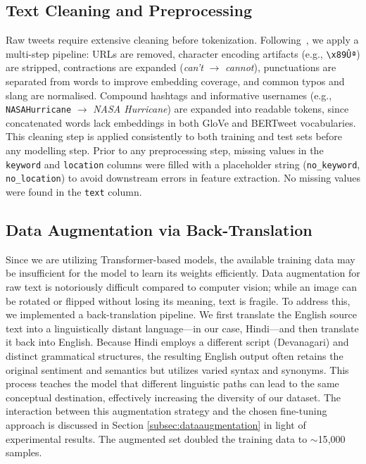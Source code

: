 \documentclass[conference]{IEEEtran}
\begin{document}
\subsection{Text Cleaning and Preprocessing}

Raw tweets require extensive cleaning before tokenization. Following~\cite{evitan2020mislabeled}, we apply a multi-step pipeline: URLs are removed, character encoding artifacts (e.g., \texttt{\textbackslash x89Ûª}) are stripped, contractions are expanded (\textit{can't} $\rightarrow$ \textit{cannot}), punctuations are separated from words to improve embedding coverage, and common typos and slang are normalised. Compound hashtags and informative usernames (e.g., \texttt{NASAHurricane} $\rightarrow$ \textit{NASA Hurricane}) are expanded into readable tokens, since concatenated words lack embeddings in both GloVe and BERTweet vocabularies. This cleaning step is applied consistently to both training and test sets before any modelling step. Prior to any preprocessing step, missing values in the \texttt{keyword} and \texttt{location} columns were filled with a placeholder string (\texttt{no\_keyword}, \texttt{no\_location}) to avoid downstream errors in feature extraction. No missing values were found in the \texttt{text} column.

\subsection{Data Augmentation via Back-Translation}

Since we are utilizing Transformer-based models, the available training data may be insufficient for the model to learn its weights efficiently. Data augmentation for raw text is notoriously difficult compared to computer vision; while an image can be rotated or flipped without losing its meaning, text is fragile. To address this, we implemented a back-translation pipeline. We first translate the English source text into a linguistically distant language—in our case, Hindi—and then translate it back into English. Because Hindi employs a different script (Devanagari) and distinct grammatical structures, the resulting English output often retains the original sentiment and semantics but utilizes varied syntax and synonyms. This process teaches the model that different linguistic paths can lead to the same conceptual destination, effectively increasing the diversity of our dataset. The interaction between this augmentation strategy and the chosen fine-tuning approach is discussed in Section \ref{subsec:dataaugmentation} in light of experimental results. The augmented set doubled the training data to $\sim$15{,}000 samples.
\end{document}
